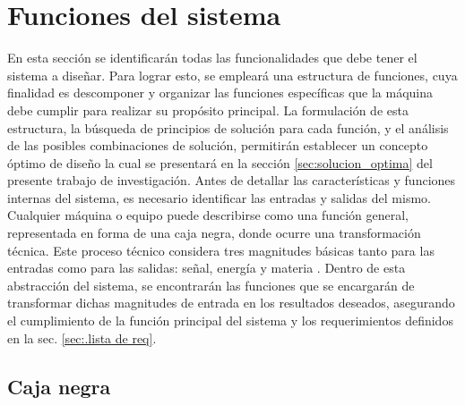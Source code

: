 \section{Funciones del sistema}
\label{sec:CH03_FUNCIONES}

\noindent
En esta sección se identificarán todas las funcionalidades que debe tener el sistema a diseñar. Para lograr esto, se empleará una estructura de funciones, cuya finalidad es descomponer y organizar las funciones específicas que la máquina debe cumplir para realizar su propósito principal. La formulación de esta estructura, la búsqueda de principios de solución para cada función, y el análisis de las posibles combinaciones de solución, permitirán establecer un concepto óptimo de diseño la cual se presentará en la sección \ref{sec:solucion_optima} del presente trabajo de investigación.
Antes de detallar las características y funciones internas del sistema, es necesario identificar las entradas y salidas del mismo. Cualquier máquina o equipo puede describirse como una función general, representada en forma de una caja negra, donde ocurre una transformación técnica. Este proceso técnico considera tres magnitudes básicas tanto para las entradas como para las salidas: señal, energía y materia \autocite{imagen_v}.
Dentro de esta abstracción del sistema, se encontrarán las funciones que se encargarán de transformar dichas magnitudes de entrada en los resultados deseados, asegurando el cumplimiento de la función principal del sistema y los requerimientos definidos en la sec. \ref{sec:.lista de req}.

\subsection{Caja negra}

